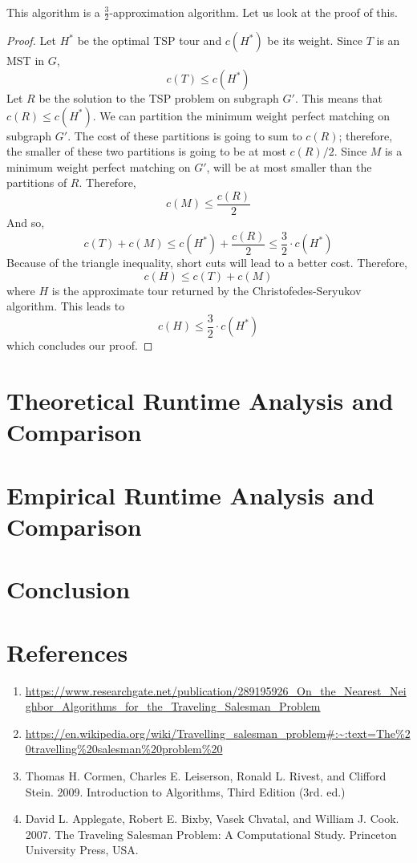\documentclass[11pt]{article}
\begin{document}
  \paragraph{}
  This algorithm is a $\frac{3}{2}$-approximation algorithm. Let us look at the proof of this. 
  \begin{proof}
    Let $H^*$ be the optimal TSP tour and $c(H^*)$ be its weight. 
    Since $T$ is an MST in $G$, \[c(T) \leq c(H^*)\] 
    Let $R$ be the solution to the TSP problem on subgraph $G'$. This means that $c(R) \leq c(H^*)$. We can partition the minimum weight perfect matching 
    on subgraph $G'$. The cost of these partitions is going to sum to $c(R)$; therefore, the smaller of these two partitions is 
    going to be at most $c(R)/2$. Since $M$ is a minimum weight perfect matching on $G'$, will be at most smaller than the partitions of $R$. 
    Therefore, \[c(M) \leq \frac{c(R)}{2}\]
    And so, \[c(T) + c(M) \leq c(H^*) + \frac{c(R)}{2} \leq \frac{3}{2} \cdot c(H^*)\]
    Because of the triangle inequality, short cuts will lead to a better cost. Therefore, 
    \[c(H) \leq c(T) + c(M) \] where $H$ is the approximate tour returned by the Christofedes-Seryukov algorithm. This leads to
    \[c(H) \leq \frac{3}{2} \cdot c(H^*)\]
    which concludes our proof.
  \end{proof}



  \section{Theoretical Runtime Analysis and Comparison}
\section{Empirical Runtime Analysis and Comparison}
\section{Conclusion}
\newpage
\section{References}
\begin{enumerate}
	\item \url{https://www.researchgate.net/publication/289195926_On_the_Nearest_Neighbor_Algorithms_for_the_Traveling_Salesman_Problem}
	\item \url{https://en.wikipedia.org/wiki/Travelling_salesman_problem#:~:text=The%20travelling%20salesman%20problem%20}
	\item Thomas H. Cormen, Charles E. Leiserson, Ronald L. Rivest, and Clifford Stein. 2009. Introduction to Algorithms, Third Edition (3rd. ed.)
	\item David L. Applegate, Robert E. Bixby, Vasek Chvatal, and William J. Cook. 2007. The Traveling Salesman Problem: A Computational Study. Princeton University Press, USA.
\end{enumerate}
\end{document}
